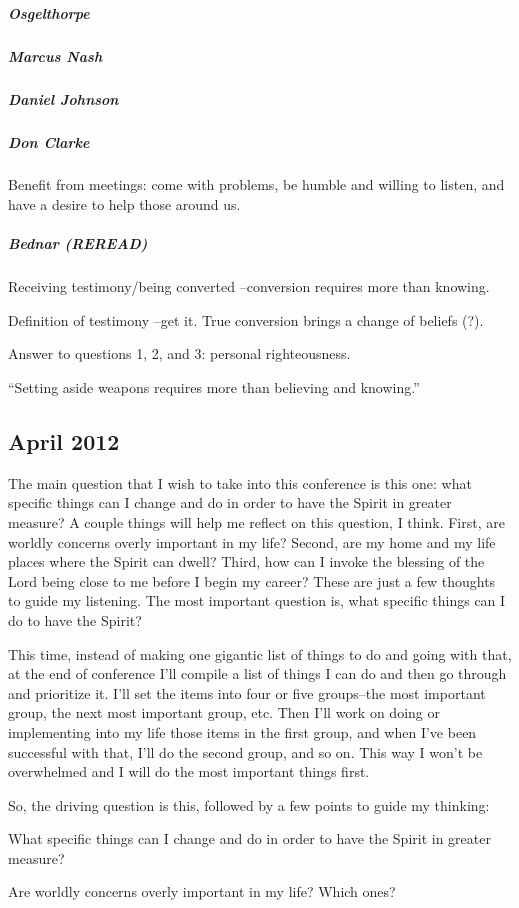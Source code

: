 \subparagraph*{Osgelthorpe}

\subparagraph*{Marcus Nash}

\subparagraph*{Daniel Johnson}

\subparagraph*{Don Clarke} Benefit from meetings: come with problems, be humble and willing to listen, and have a desire to help those around us.

\subparagraph*{Bednar (REREAD)} Receiving testimony/being converted --conversion requires more than knowing.

Definition of testimony --get it. True conversion brings a change of beliefs (?).

Answer to questions 1, 2, and 3: personal righteousness.

``Setting aside weapons requires more than believing and knowing.''

\subsection{April 2012}

The main question that I wish to take into this conference is this one: what specific things can I change and do in order to have the Spirit in greater measure? A couple things will help me reflect on this question, I think. First, are worldly concerns overly important in my life? Second, are my home and my life places where the Spirit can dwell? Third, how can I invoke the blessing of the Lord being close to me before I begin my career? These are just a few thoughts to guide my listening. The most important question is, what specific things can I do to have the Spirit?

This time, instead of making one gigantic list of things to do and going with that, at the end of conference I'll compile a list of things I can do and then go through and prioritize it. I'll set the items into four or five groups--the most important group, the next most important group, etc. Then I'll work on doing or implementing into my life those items in the first group, and when I've been successful with that, I'll do the second group, and so on. This way I won't be overwhelmed and I will do the most important things first.

So, the driving question is this, followed by a few points to guide my thinking:

What specific things can I change and do in order to have the Spirit in greater measure?

Are worldly concerns overly important in my life? Which ones?

